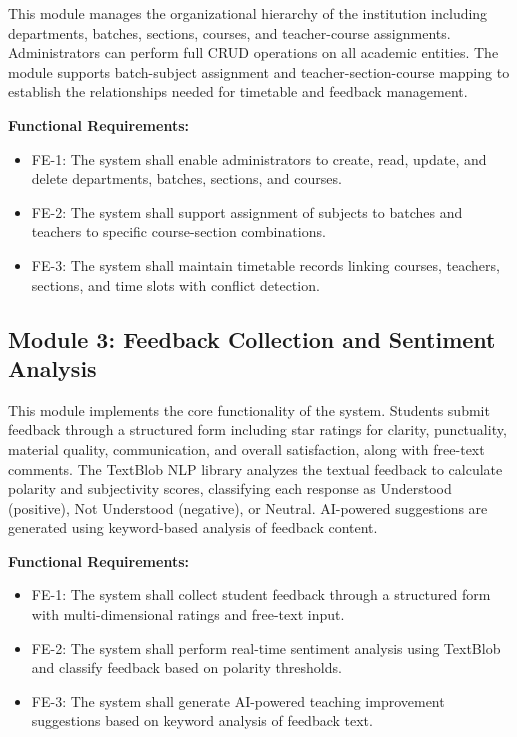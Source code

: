 This module manages the organizational hierarchy of the institution including departments, batches, sections, courses, and teacher-course assignments. Administrators can perform full CRUD operations on all academic entities. The module supports batch-subject assignment and teacher-section-course mapping to establish the relationships needed for timetable and feedback management.

\textbf{Functional Requirements:}

\begin{itemize}
    \item FE-1: The system shall enable administrators to create, read, update, and delete departments, batches, sections, and courses.
    \item FE-2: The system shall support assignment of subjects to batches and teachers to specific course-section combinations.
    \item FE-3: The system shall maintain timetable records linking courses, teachers, sections, and time slots with conflict detection.
\end{itemize}



\subsection{Module 3: Feedback Collection and Sentiment Analysis}

This module implements the core functionality of the system. Students submit feedback through a structured form including star ratings for clarity, punctuality, material quality, communication, and overall satisfaction, along with free-text comments. The TextBlob NLP library analyzes the textual feedback to calculate polarity and subjectivity scores, classifying each response as Understood (positive), Not Understood (negative), or Neutral. AI-powered suggestions are generated using keyword-based analysis of feedback content.

\textbf{Functional Requirements:}

\begin{itemize}
    \item FE-1: The system shall collect student feedback through a structured form with multi-dimensional ratings and free-text input.
    \item FE-2: The system shall perform real-time sentiment analysis using TextBlob and classify feedback based on polarity thresholds.
    \item FE-3: The system shall generate AI-powered teaching improvement suggestions based on keyword analysis of feedback text.
\end{itemize}




